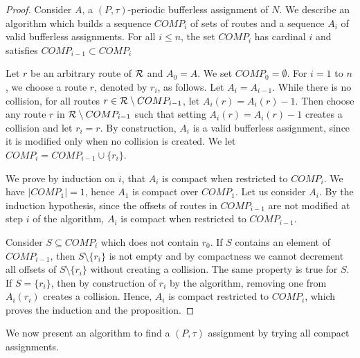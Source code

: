 \documentclass[a4paper,10pt]{journal}
\begin{document}
\begin{proof}
Consider $A$, a $(P,\tau)$-periodic bufferless assignment of $N$.
We describe an algorithm which builds a sequence $COMP_i$ of sets of routes and a sequence  
$A_i$ of valid bufferless assignments. For all $i \leq n$, the set $COMP_i$ has cardinal $i$ and satisfies  $COMP_{i-1} \subset COMP_i$

Let $r$ be an arbitrary route of ${\cal R}$ and $A_0 = A$. We set $COMP_0 = \emptyset$.
 For $i = 1$ to $n$, we choose a route $r$, denoted by $r_i$, as follows.
Let $A_{i} = A_{i-1}$. While there is no collision, for all routes $r \in {\cal R} \setminus COMP_{i-1}$, let $A_i(r) = A_i(r) - 1$. Then choose any route $r$ in ${\cal R} \setminus COMP_{i-1}$ such that setting $A_i(r) = A_i(r)-1$ creates a collision and let $r_i = r$. By construction, $A_i$ is a valid bufferless assignment, since it is modified only when no collision is created. We let $COMP_i = COMP_{i-1} \cup \{r_i\}$.

We prove by induction on $i$, that $A_i$ is compact when restricted to $COMP_{i}$.
We have $|COMP_1| = 1$, hence $A_1$ is compact over $COMP_1$. Let us consider $A_i$. By the induction hypothesis, since the offsets of routes in $COMP_{i-1}$ are not modified at step $i$ of the algorithm, $A_i$ is compact when restricted to $COMP_{i-1}$. 

 Consider $S \subseteq COMP_i$ which does not contain $r_0$. If $S$ contains
an element of $COMP_{i-1}$, then $S \setminus \{r_i\}$ is not empty and by compactness we cannot decrement all offsets of $S\setminus \{r_i\}$ without creating a collision. The same property is true for $S$. If $S = \{r_i\}$, then by construction of $r_i$ by the algorithm, removing one from $A_i(r_i)$ creates a collision. Hence, $A_i$ is compact restricted to $COMP_{i}$, which proves the induction and the proposition.
\end{proof}

We now present an algorithm to find a $(P,\tau)$ assignment by trying all compact assignments.
\end{document}
